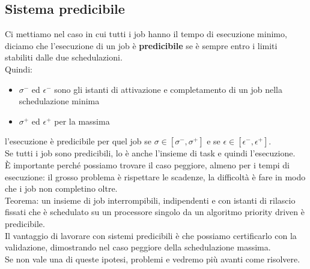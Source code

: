 \documentclass[12pt, oneside]{extbook}
\begin{document}
\subsection{Sistema predicibile}

Ci mettiamo nel caso in cui tutti i job hanno il tempo di esecuzione minimo, diciamo che l'esecuzione di un job è \textbf{predicibile} se è sempre entro i limiti stabiliti dalle due schedulazioni.\\
Quindi:
\begin{itemize}
	\item $\sigma^{-}$ ed $\epsilon^{-}$ sono gli istanti di attivazione e completamento di un job nella schedulazione minima
	\item $\sigma^{+}$ ed $\epsilon^{+}$ per la massima
\end{itemize}
l'esecuzione è predicibile per quel job se $\sigma \in [\sigma^{-}, \sigma^{+}]$ e se $\epsilon \in [\epsilon^{-}, \epsilon^{+}]$.\\
Se tutti i job sono predicibili, lo è anche l'insieme di task e quindi l'esecuzione.\\
È importante perché possiamo trovare il caso peggiore, almeno per i tempi di esecuzione: il grosso problema è rispettare le scadenze, la difficoltà è fare in modo che i job non completino oltre.\\
Teorema: un insieme di job interrompibili, indipendenti e con istanti di rilascio fissati che è schedulato su un processore singolo da un algoritmo priority driven è predicibile.\\
Il vantaggio di lavorare con sistemi predicibili è che possiamo certificarlo con la validazione, dimostrando nel caso peggiore della schedulazione massima.\\
Se non vale una di queste ipotesi, problemi e vedremo più avanti come risolvere.
\end{document}
